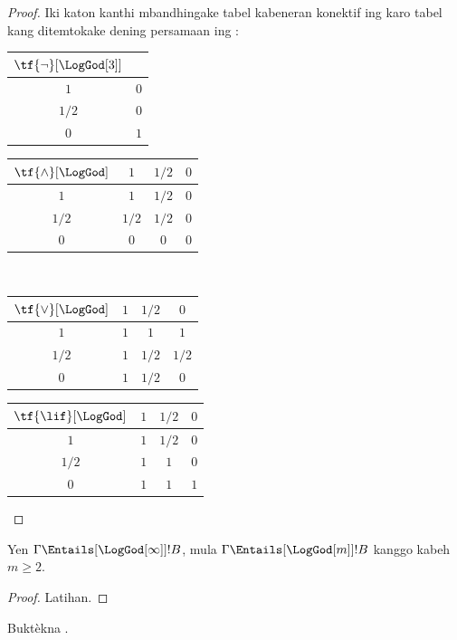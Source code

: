 \documentclass[../../../include/open-logic-section]{subfiles}
\begin{document}
\begin{proof}
  Iki katon kanthi mbandhingake tabel kabeneran konektif ing
   karo tabel kang ditemtokake
  dening persamaan ing :
  \begin{center}
    \begin{tabular}{c|c} 
      $\tf{\lnot}[\LogGod[3]]$ & \\ 
      \hline  
      $1$ & $0$ \\ 
      $1/2$ & $0$ \\
      $0$ & $1$ 
    \end{tabular}
    \quad
    \begin{tabular}{c|ccc} 
      $\tf{\land}[\LogGod]$ & $1$ & $1/2$ & $0$ \\ 
      \hline 
      $1$ & $1$ & $1/2$ & $0$ \\ 
      $1/2$ & $1/2$ & $1/2$ & $0$\\ 
      $0$ & $0$ & $0$ & $0$ 
    \end{tabular}
    \\[2ex]
    \begin{tabular}{c|ccc} 
      $\tf{\lor}[\LogGod]$ & $1$ & $1/2$ & $0$ \\ 
      \hline 
      $1$ & $1$ & $1$ & $1$ \\ 
      $1/2$ & $1$ & $1/2$ & $1/2$ \\
      $0$ & $1$ & $1/2$ & $0$ 
    \end{tabular}
    \quad
    \begin{tabular}{c|ccc} 
      $\tf{\lif}[\LogGod]$ & $1$ & $1/2$ & $0$ \\ 
      \hline 
      $1$ & $1$ & $1/2$ & $0$ \\ 
      $1/2$ & $1$ & $1$ & $0$  \\ 
      $0$ & $1$ & $1$ & $1$ 
    \end{tabular}
  \end{center} 
\end{proof}

\begin{prop}
  Yen $\Gamma \Entails[\LogGod[\infty]] !B$, mula $\Gamma
  \Entails[\LogGod[m]] !B$ kanggo kabeh~$m \ge 2$.
\end{prop}

\begin{proof}
  Latihan.
\end{proof}

\begin{prob}
  Buktèkna .
\end{prob}
\end{document}
